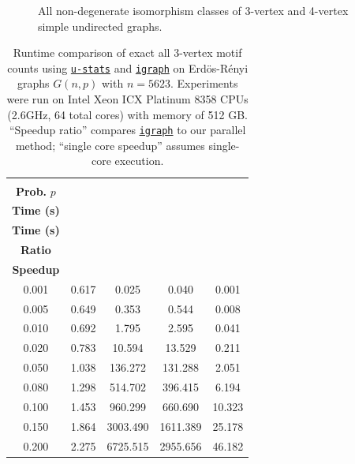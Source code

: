 \documentclass[letterpaper,11pt]{article}
\newcommand{\libref}[2]{\href{#2}{\texttt{#1}}}
\def\package{\libref{u-stats}{https://github.com/zrq1706/U-Statistics-Python}}
\def\igraph{\libref{igraph}{https://igraph.org/}}
\begin{document}
\begin{bibunit}[plainnat]
\begin{figure}[ht]
    \caption{All non-degenerate isomorphism classes of 3-vertex and 4-vertex simple undirected graphs.}
    \label{fig:motif-3-4}
\end{figure}

\begin{table}[ht]
\centering
\caption{
Runtime comparison of exact all $3$-vertex motif counts using \package{} and \igraph{} on Erd\"{o}s-R\'{e}nyi graphs $G(n, p)$ with $n = 5623$. 
Experiments were run on Intel Xeon ICX Platinum 8358 CPUs (2.6GHz, 64 total cores) with memory of 512 GB.
“Speedup ratio” compares \igraph{} to our parallel method; “single core speedup” assumes single-core execution.
}

\label{tab:motif_counts_3}
\begin{tabular}{ccccc}
\toprule
\makecell{\textbf{Edge} \\ \textbf{Prob.} $p$} & \makecell{\package{} \\ \textbf{Time (s)}} & \makecell{\textbf{\igraph{}} \\ \textbf{Time (s)}} &\makecell{\textbf{Speedup} \\ \textbf{Ratio}} &  \makecell{\textbf{Single-Core} \\ \textbf{Speedup}} \\
\midrule
0.001 & 0.617 & 0.025 & 0.040 & 0.001 \\
0.005 & 0.649 & 0.353 & 0.544 & 0.008 \\
0.010 & 0.692 & 1.795 & 2.595 & 0.041 \\
0.020 & 0.783 & 10.594 & 13.529 & 0.211 \\
0.050 & 1.038 & 136.272 & 131.288 & 2.051 \\
0.080 & 1.298 & 514.702 & 396.415 & 6.194 \\
0.100 & 1.453 & 960.299 & 660.690 & 10.323 \\
0.150 & 1.864 & 3003.490 & 1611.389 & 25.178 \\
0.200 & 2.275 & 6725.515 & 2955.656 & 46.182 \\
\bottomrule
\end{tabular}
\end{table}



\end{bibunit}
\end{document}
